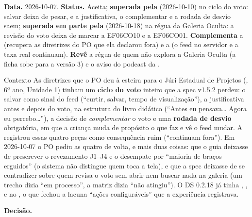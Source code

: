 \textbf{Data.} 2026-10-07. \textbf{Status.} Aceita; \textbf{superada pela
} (2026-10-10) no ciclo do voto: salvar deixa de pesar, e a
justificativa, o complementar e a rodada de desvio saem; \textbf{superada em
parte pela } (2026-10-18) na régua da Galeria Oculta: a revisão
do voto deixa de marcar a EF06CO10 e a EF06CO01. \textbf{Complementa} a
 (recupera as diretrizes do PO que ela declarou fora) e a
 (o feed no servidor e a taxa real continuam). \textbf{Revê} a
régua de quem não explora a Galeria Oculta (a ficha sobe para a versão 3) e o
aviso do podcast da .

\begin{especificacao}{Contexto}
As diretrizes que o PO deu à esteira para o Júri Estadual de Projetos
(, 6º ano, Unidade 1) tinham um \textbf{ciclo do voto} inteiro
que a spec v1.5.2 perdeu: o salvar como sinal do feed (\enquote{curtir, salvar,
tempo de visualização}), a justificativa antes e depois do voto, na estrutura
do livro didático (\enquote{Antes eu pensava\ldots{} Agora eu percebo\ldots}),
a decisão de \emph{complementar} o voto e uma \textbf{rodada de desvio}
obrigatória, em que a criança muda de propósito o que faz e vê o feed mudar.
A  registrou essas quatro peças como consequência ruim
(\enquote{continuam fora}). Em 2026-10-07 o PO pediu as quatro de volta, e mais
duas coisas: que o guia deixasse de prescrever o revezamento J1--J4 e o
desempate por \enquote{maioria de braços erguidos} (o sistema não distingue
quem toca a tela), e que a spec deixasse de se contradizer sobre quem revisa o
voto sem abrir nem buscar nada na galeria (um trecho dizia \enquote{em
processo}, a matriz dizia \enquote{não atingiu}). O DS 0.2.18 já tinha
, ,  e  no
, o que fechou a lacuna \enquote{ações configuráveis} que
a experiência registrava.
\end{especificacao}

\textbf{Decisão.}

